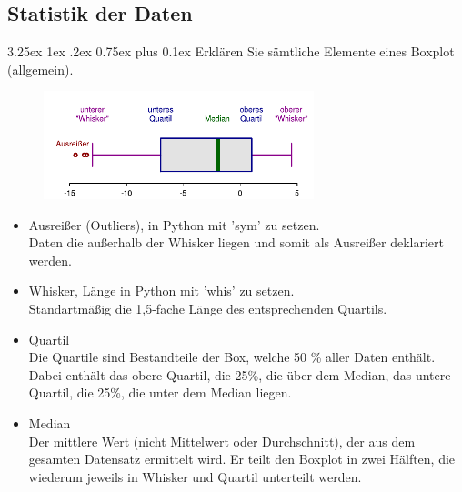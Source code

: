 \documentclass[12pt,a4paper]{scrartcl}
\makeatletter
\renewcommand\subparagraph{\@startsection{subparagraph}{5}{\parindent}%
    {3.25ex \@plus1ex \@minus .2ex}%
    {0.75ex plus 0.1ex}%
    {\normalfont\normalsize\bfseries}}
\makeatother
\begin{document}
\subsection*{Statistik der Daten}

\subparagraph{Erkl\"aren Sie s\"amtliche Elemente eines Boxplot (allgemein). }
\begin{figure}[!h]
\centering
\includegraphics[width=0.7\textwidth]{Plots/Elements_of_a_boxplot.pdf}
\end{figure}
\begin{itemize}
\item Ausrei\ss er (\grqq Outliers\grqq ), in Python mit 'sym' zu setzen. \\
Daten die au\ss erhalb der Whisker liegen und somit als Ausrei\ss er deklariert werden.
\item Whisker, L\"ange in Python mit 'whis' zu setzen.\\
Standartm\"a\ss ig die 1,5-fache L\"ange des entsprechenden Quartils. 
\item Quartil\\
Die Quartile sind Bestandteile der Box, welche 50 \% aller Daten enth\"alt. Dabei enth\"alt das obere Quartil, die 25\%, die \"uber dem Median, das untere Quartil, die 25\%, die unter dem Median liegen.
\item Median\\
Der mittlere Wert (nicht Mittelwert oder Durchschnitt), der aus dem gesamten Datensatz ermittelt wird. Er teilt den Boxplot in zwei H\"alften, die wiederum jeweils in Whisker und Quartil unterteilt werden.
\end{itemize}
\end{document}

